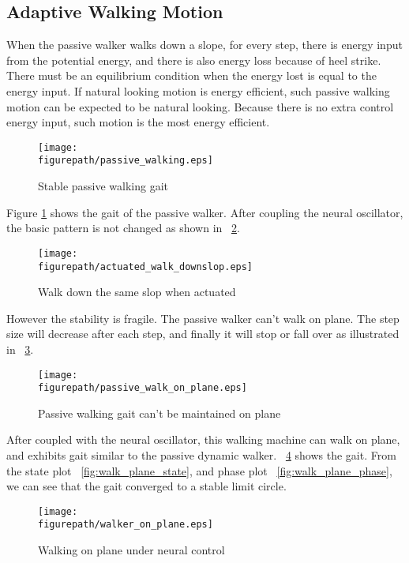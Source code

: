 \subsection{Adaptive Walking Motion}
When the passive walker walks down a slope, for every step, there is energy input from the potential energy,
and there is also energy loss because of heel strike. 
There must be an equilibrium condition when the energy lost is equal to the energy input. 
If natural looking motion is energy efficient, such passive walking motion can be expected to be natural looking. 
Because there is no extra control energy input, such motion is the most energy efficient.

\begin{figure}[H]
\centering
\texttt{[image: \\figurepath/passive\_walking.eps]}
\caption{Stable passive walking gait}
\label{fig:passive_walk}
\end{figure}
Figure \ref{fig:passive_walk} shows the gait of the passive walker. 
After coupling the neural oscillator, the basic pattern is not changed  as shown in \figurename ~\ref{fig:stable_active_walk}.

\begin{figure}[H]
\centering
\texttt{[image: \\figurepath/actuated\_walk\_downslop.eps]}
\caption{Walk down the same slop when actuated}
\label{fig:stable_active_walk}
\end{figure}

However the stability is fragile.  
The passive walker can't walk on plane. 
The step size will decrease after each step, and finally it will stop or fall over as illustrated in \figurename ~\ref{fig:pass_waling_on_plane}.
\begin{figure}[!h]
\centering
\texttt{[image: \\figurepath/passive\_walk\_on\_plane.eps]}
\caption{Passive walking gait can't be maintained on plane}
\label{fig:pass_waling_on_plane}
\end{figure}

After coupled with the neural oscillator, this walking machine can walk on plane, and exhibits gait similar to the passive dynamic walker. 
\figurename ~\ref{fig:walk_plane} shows the gait. 
From the state plot \figurename ~\ref{fig:walk_plane_state}, and phase plot \figure ~\ref{fig:walk_plane_phase}, we can see that the gait converged to a stable limit circle.

\begin{figure}[!h]
\centering
\texttt{[image: \\figurepath/walker\_on\_plane.eps]}
\caption{Walking on plane under neural control}
\label{fig:walk_plane}
\end{figure}


